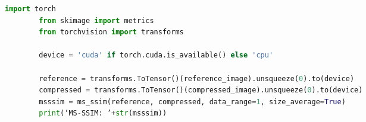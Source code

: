 \begin{adjustbox}{max width=\textwidth}   
    \begin{lstlisting}[language=Python, caption=Spezzone di codice per il calcolo dell'MS-SSIM, label=code:MSSSIMComputation]
        import torch
        from skimage import metrics
        from torchvision import transforms
        
        device = 'cuda' if torch.cuda.is_available() else 'cpu'
        
        reference = transforms.ToTensor()(reference_image).unsqueeze(0).to(device)
        compressed = transforms.ToTensor()(compressed_image).unsqueeze(0).to(device)
        msssim = ms_ssim(reference, compressed, data_range=1, size_average=True)
        print(‘MS-SSIM: ’+str(msssim))
    \end{lstlisting}
\end{adjustbox} 


